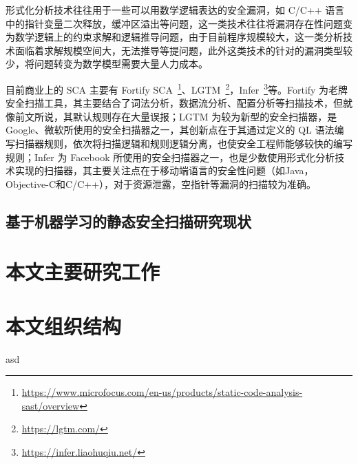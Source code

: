 形式化分析技术往往用于一些可以用数学逻辑表达的安全漏洞，如 C/C++ 语言中的指针变量二次释放，缓冲区溢出等问题，这一类技术往往将漏洞存在性问题变为数学逻辑上的约束求解和逻辑推导问题，由于目前程序规模较大，这一类分析技术面临着求解规模空间大，无法推导等提问题，此外这类技术的针对的漏洞类型较少，将问题转变为数学模型需要大量人力成本。

目前商业上的 SCA 主要有 Fortify SCA~\footnote{\url{https://www.microfocus.com/en-us/products/static-code-analysis-sast/overview}}、LGTM~\footnote{\url{https://lgtm.com/}}，Infer~\footnote{\url{https://infer.liaohuqiu.net/}}等。Fortify 为老牌安全扫描工具，其主要结合了词法分析，数据流分析、配置分析等扫描技术，但就像前文所说，其默认规则存在大量误报；LGTM 为较为新型的安全扫描器，是 Google、微软所使用的安全扫描器之一，其创新点在于其通过定义的 QL 语法编写扫描器规则，依次将扫描逻辑和规则逻辑分离，也使安全工程师能够较快的编写规则；Infer 为 Facebook 所使用的安全扫描器之一，也是少数使用形式化分析技术实现的扫描器，其主要关注点在于移动端语言的安全性问题（如Java， Objective-C和C/C++），对于资源泄露，空指针等漏洞的扫描较为准确。\\

\subsection{基于机器学习的静态安全扫描研究现状}

\section{本文主要研究工作}


\section{本文组织结构}
asd